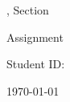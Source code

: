\ifx\CROWDMARK\undefined

\ifx\assignmenttitle\undefined
\newcommand{\assignmenttitle}{Assignment \assignmentnum}
\fi
\begin{titlepage}
\centering

\vspace*{2.5cm}

\ifx\hwtitlelarge\undefined
\newcommand{\hwtitlelarge}{
\coursename
\ifdefined\coursesec
, Section \coursesec
\fi
\vspace{0.5cm}

\assignmenttitle
}
\fi

{\Large 
\hwtitlelarge
}

\vspace{3.5cm}
        
\textit{\studentname}

\vspace{.5cm}

Student ID: \studentid
\vspace{3.5cm}

\today

\end{titlepage}

\let\hwtitlelarge\undefined
   
\fi